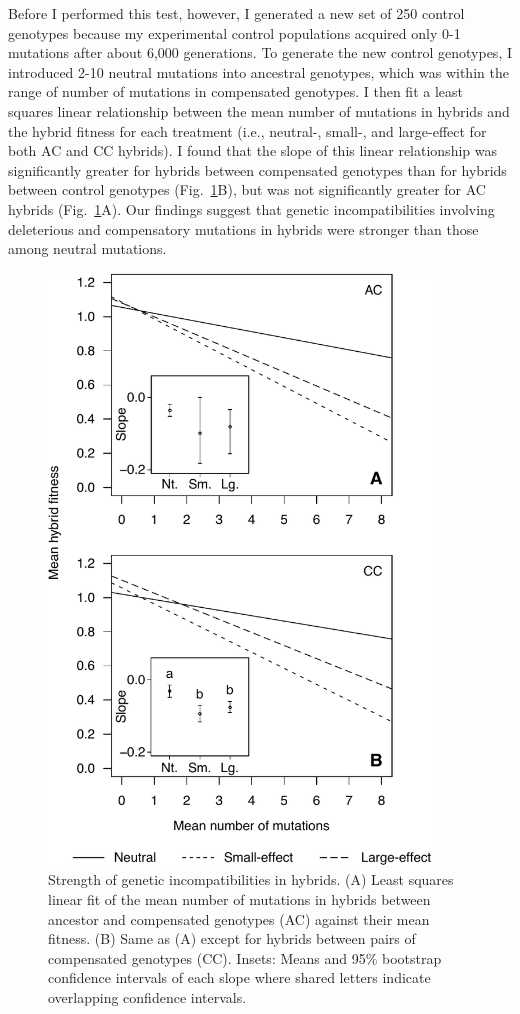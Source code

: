 \begin{doublespace}
Before I performed this test, however,
I generated a new set of 250 control genotypes
because my experimental control populations
acquired only 0-1 mutations after about 6,000 generations.
%
To generate the new control genotypes,
I introduced 2-10 neutral mutations into ancestral genotypes,
which was within the range of number of mutations in compensated genotypes.
%
I then fit a least squares linear relationship between
the mean number of mutations in hybrids
and the hybrid fitness for each treatment
(i.e., neutral-, small-, and large-effect for both AC and CC hybrids).
%
I found that the slope of this linear relationship
was significantly greater for hybrids between compensated genotypes
than for hybrids between control genotypes (Fig.~\ref{fig2}B),
but was not significantly greater for AC hybrids (Fig.~\ref{fig2}A).
%
Our findings suggest that genetic incompatibilities
involving deleterious and compensatory mutations in hybrids
were stronger than those among neutral mutations.



\begin{figure}
\centering
\includegraphics[width=4in]{fig2.pdf}
\caption{Strength of genetic incompatibilities in hybrids.
  (A) Least squares linear fit of the mean number of mutations in hybrids
  between ancestor and compensated genotypes (AC) against their mean fitness.
  (B) Same as (A) except for hybrids between pairs of compensated genotypes
  (CC). Insets: Means and 95\% bootstrap confidence intervals of each slope
  where shared letters indicate overlapping confidence intervals.}
\label{fig2}
\end{figure}




\end{doublespace}
